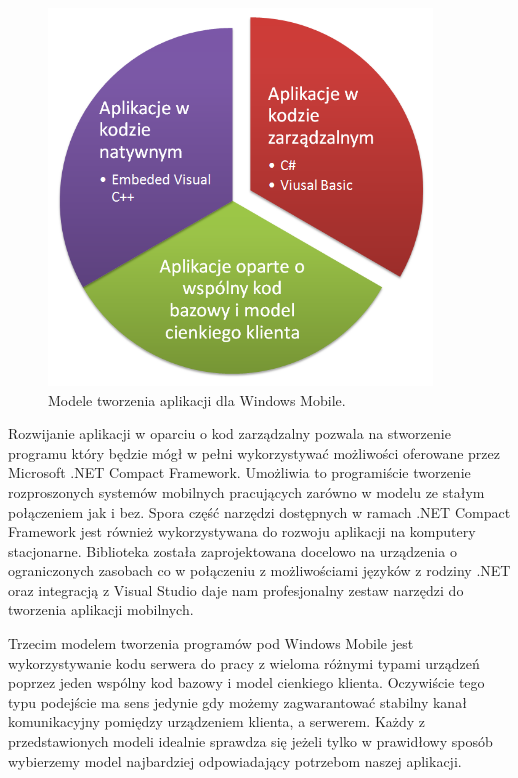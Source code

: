 \begin{figure}[h!]
 \centering
 \includegraphics[height=100mm]{../images/ch03/wm_app_models.png}
 \caption{Modele tworzenia aplikacji dla Windows Mobile.}
 \label{fig:WMDevelopmentEnviroment}
\end{figure}

Rozwijanie aplikacji w oparciu o kod zarządzalny pozwala na stworzenie programu
który będzie mógł w pełni wykorzystywać możliwości oferowane przez Microsoft .NET
Compact Framework. Umożliwia to programiście tworzenie rozproszonych systemów
mobilnych pracujących zarówno w modelu ze stałym połączeniem jak i bez. Spora
część narzędzi dostępnych w ramach .NET Compact Framework jest również
wykorzystywana do rozwoju aplikacji na komputery stacjonarne. Biblioteka została
zaprojektowana docelowo na urządzenia o ograniczonych zasobach co w połączeniu z
możliwościami języków z rodziny .NET oraz integracją z Visual Studio daje nam
profesjonalny zestaw narzędzi do tworzenia aplikacji mobilnych.

Trzecim modelem tworzenia programów pod Windows Mobile jest wykorzystywanie kodu
serwera do pracy z wieloma różnymi typami urządzeń poprzez jeden wspólny kod
bazowy i model cienkiego klienta. Oczywiście tego typu podejście ma sens jedynie
gdy możemy zagwarantować stabilny kanał komunikacyjny pomiędzy urządzeniem
klienta, a serwerem. Każdy z przedstawionych modeli idealnie sprawdza się jeżeli
tylko w prawidłowy sposób wybierzemy model najbardziej odpowiadający potrzebom
naszej aplikacji.

